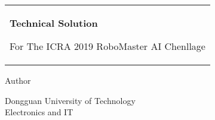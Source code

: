 \begin{titlepage}


\noindent
\begin{tabular}{@{}p{\textwidth}@{}}
	\vspace{0.2cm}
	\begin{center}
		\Huge{\textbf{Technical Solution}}
	\end{center}

	\begin{center}
		\Large{For The ICRA 2019 RoboMaster AI Chenllage}
	\end{center}
	
	\vspace{0.2cm}\\
\end{tabular}

\vspace{4 cm}
\begin{center}{\large Author}\\
	\vspace{0.2cm}{\Large Yi-Kang Gu}

	\vspace{0.2cm}{\Large Zhao-Yi Meng}

\end{center}

\vfill
\begin{center}
  Dongguan University of Technology\\
  Electronics and IT
\end{center}


\end{titlepage}
\clearpage